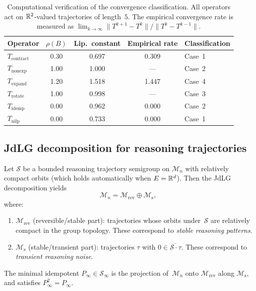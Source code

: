 \begin{table}[h]
  \centering
  \caption{Computational verification of the convergence classification.
    All operators act on $\mathbb{R}^2$-valued trajectories of length~$5$. The
    empirical convergence rate is measured as
    $\lim_{k\to\infty}\|T^{k+1}-T^k\|/\|T^k-T^{k-1}\|$.}
  \label{tab:verification}
  \begin{tabular}{@{}lcccl@{}}
    \toprule
    Operator & $\rho(B)$ & Lip.\ constant & Empirical rate & Classification \\
    \midrule
    $T_{\mathrm{contract}}$ & 0.30 & 0.697 & 0.309 & Case~1 \\
    $T_{\mathrm{nonexp}}$ & 1.00 & 1.000 & --- & Case~2 \\
    $T_{\mathrm{expand}}$ & 1.20 & 1.518 & 1.447 & Case~4 \\
    $T_{\mathrm{rotate}}$ & 1.00 & 0.998 & --- & Case~3 \\
    $T_{\mathrm{idemp}}$ & 0.00 & 0.962 & 0.000 & Case~2 \\
    $T_{\mathrm{nilp}}$ & 0.00 & 0.733 & 0.000 & Case~1 \\
    \bottomrule
  \end{tabular}
\end{table}

\subsection{JdLG decomposition for reasoning trajectories}

\begin{theorem}\label{thm:jdlg}
  Let $\mathcal{S}$ be a bounded reasoning trajectory semigroup on
  $\mathcal{M}_n$ with relatively compact orbits \textup{(}which holds
  automatically when $E=\mathbb{R}^d$\textup{)}. Then the JdLG decomposition yields
  \begin{equation}\label{eq:jdlg}
    \mathcal{M}_n = \mathcal{M}_{\mathrm{rev}}\oplus\mathcal{M}_{\mathrm{s}},
  \end{equation}
  where:
  \begin{enumerate}[label=\textup{(\alph*)}]
    \item $\mathcal{M}_{\mathrm{rev}}$ \textup{(reversible/stable part)}:
      trajectories whose orbits under~$\mathcal{S}$ are relatively compact in
      the group topology. These correspond to \emph{stable reasoning patterns}.

    \item $\mathcal{M}_{\mathrm{s}}$ \textup{(stable/transient part)}:
      trajectories $\tau$ with $0\in\overline{\mathcal{S}\cdot\tau}$. These
      correspond to \emph{transient reasoning noise}.
  \end{enumerate}
  The minimal idempotent $P_\infty\in\mathcal{S}_\infty$ is the projection
  of~$\mathcal{M}_n$ onto $\mathcal{M}_{\mathrm{rev}}$ along
  $\mathcal{M}_{\mathrm{s}}$, and satisfies $P_\infty^2=P_\infty$.
\end{theorem}

